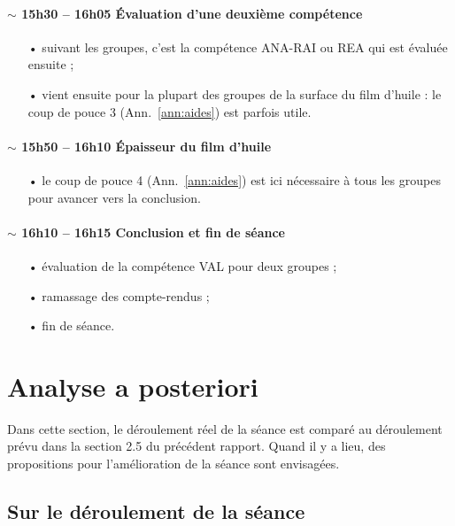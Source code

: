 \documentclass[12pt,a4paper, fleqn]{report}
\newcommand{\rea}{\colorbox{yellow_c}{\textcolor{yellow_f}{REA}}}
\newcommand{\anarai}{\colorbox{green_c}{\textcolor{green_f}{ANA-RAI}}}
\newcommand{\val}{\colorbox{orange_c}{\textcolor{orange_f}{VAL}}}
\begin{document}
\paragraph{$\sim$ 15h30 -- 16h05 Évaluation d'une deuxième compétence}
\begin{itemize}
\item[•] suivant les groupes, c'est la compétence \anarai{} ou \rea{} qui est évaluée ensuite ;
\item[•] vient ensuite pour la plupart des groupes de la surface du film d'huile : le coup de pouce 3 (Ann.~\ref{ann:aides}) est parfois utile.
\end{itemize}

\paragraph{$\sim$ 15h50 -- 16h10 Épaisseur du film d'huile}
\begin{itemize}
\item[•] le coup de pouce 4 (Ann.~\ref{ann:aides}) est ici nécessaire à tous les groupes pour avancer vers la conclusion.
\end{itemize}

\paragraph{$\sim$ 16h10 -- 16h15 Conclusion et fin de séance}
\begin{itemize}
\item[•] évaluation de la compétence \val{} pour deux groupes ;
\item[•] ramassage des compte-rendus ;
\item[•] fin de séance.
\end{itemize}

\section{Analyse a posteriori}

Dans cette section, le déroulement réel de la séance est comparé au déroulement prévu dans la section 2.5 du précédent rapport.
Quand il y a lieu, des propositions pour l'amélioration de la séance sont envisagées.

\subsection{Sur le déroulement de la séance}
\end{document}
